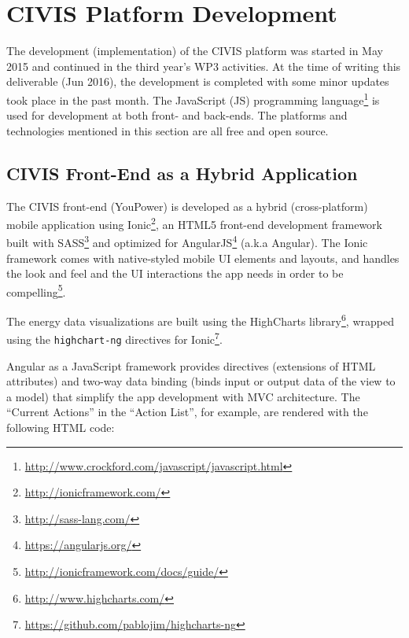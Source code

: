 \section{CIVIS Platform  Development} 
 
The development (implementation) of the CIVIS platform was started in May 2015 \citep{Huang2015c} and continued in the third year's WP3 activities. At the time of writing this deliverable (Jun 2016), the development is completed with some minor updates took place in the past month.
% 
The JavaScript (JS) programming language\footnote{\url{http://www.crockford.com/javascript/javascript.html}} is used for development at both front- and back-ends. 
The platforms and technologies mentioned in this section are all free and open source. 

\subsection{CIVIS Front-End as a Hybrid Application} 

The CIVIS front-end (YouPower) is developed as a hybrid (cross-platform) mobile application using Ionic\footnote{\url{http://ionicframework.com/}}, an HTML5 front-end development framework built with SASS\footnote{\url{http://sass-lang.com/}} and optimized for AngularJS\footnote{\url{https://angularjs.org/}} (a.k.a Angular). 
% 
The Ionic framework comes with native-styled mobile UI elements and layouts, and handles the look and feel and the UI interactions the app needs in order to be compelling\footnote{\url{http://ionicframework.com/docs/guide/}}. 

The energy data visualizations are built using the HighCharts library\footnote{\url{http://www.highcharts.com/}}, wrapped using the {\tt highchart-ng} directives for Ionic\footnote{\url{https://github.com/pablojim/highcharts-ng}}.

Angular as a JavaScript framework provides directives (extensions of HTML attributes) and two-way data binding (binds input or output data of the view to a model) that simplify the app development with MVC architecture. The ``Current Actions'' in the ``Action List'', for example, are rendered with the following HTML code: 

